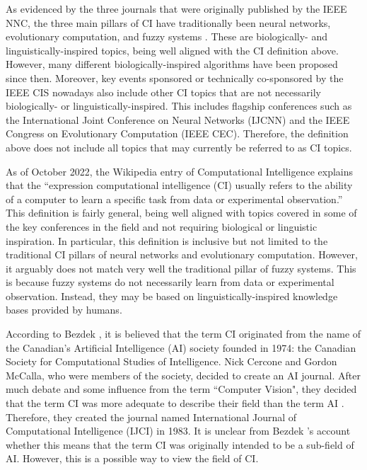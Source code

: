 As evidenced by the three journals that were originally published by the IEEE NNC, the three main pillars of CI have traditionally been neural networks, evolutionary computation, and fuzzy systems \cite{ciswebsite}. These are biologically- and linguistically-inspired topics, being well aligned with the CI definition above. However, many different biologically-inspired algorithms have been proposed since then. Moreover, key events sponsored or technically co-sponsored by the IEEE CIS nowadays also include other CI topics that are not necessarily biologically- or linguistically-inspired. This includes flagship conferences such as the International Joint Conference on Neural Networks (IJCNN) and the IEEE Congress on Evolutionary Computation (IEEE CEC). Therefore, the definition above does not include all topics that may currently be referred to as CI topics.

As of October 2022, the Wikipedia entry of Computational Intelligence \cite{ciswiki} explains that the ``expression computational intelligence (CI) usually refers to the ability of a computer to learn a specific task from data or experimental observation.'' This definition is fairly general, being well aligned with topics covered in some of the key conferences in the field and not requiring biological or linguistic inspiration. In particular, this definition is inclusive but not limited to the traditional CI pillars of neural networks and evolutionary computation. However, it arguably does not match very well the traditional pillar of fuzzy systems. This is because fuzzy systems do not necessarily learn from data or experimental observation. Instead, they may be based on linguistically-inspired knowledge bases provided by humans. 

According to Bezdek \cite{Bezdek}, it is believed that the term CI originated from the name of the Canadian's Artificial Intelligence (AI) society founded in 1974: the Canadian Society for Computational Studies of Intelligence. Nick Cercone and Gordon McCalla, who were members of the society, decided to create an AI journal. After much debate and some influence from the term ``Computer Vision", they decided that the term CI was more adequate to describe their field than the term AI \cite{Bezdek}. Therefore, they created the journal named International Journal of Computational Intelligence (IJCI) in 1983. It is unclear from Bezdek \cite{Bezdek}'s account whether this means that the term CI was originally intended to be a sub-field of AI. However, this is a possible way to view the field of CI.

